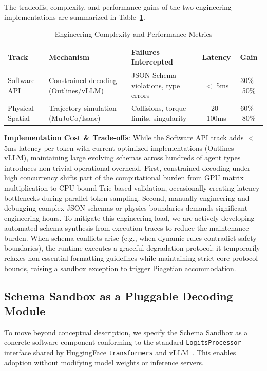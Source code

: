 \documentclass[10pt,journal,compsoc]{IEEEtran}
\begin{document}
The tradeoffs, complexity, and performance gains of the two engineering implementations are summarized in Table~\ref{tab:engineering}.

\begin{table}[t]
\centering
\caption{Engineering Complexity and Performance Metrics}
\label{tab:engineering}
\footnotesize
\begin{tabular}{lp{1.8cm}p{1.8cm}cc}
\toprule
\textbf{Track} & \textbf{Mechanism} & \textbf{Failures Intercepted} & \textbf{Latency} & \textbf{Gain} \\
\midrule
Software API & Constrained decoding (Outlines/vLLM) & JSON Schema violations, type errors & $<$ 5ms & 30\%--50\% \\
\midrule
Physical Spatial & Trajectory simulation (MuJoCo/Isaac) & Collisions, torque limits, singularity & 20--100ms & 60\%--80\% \\
\bottomrule
\end{tabular}
\end{table}

\textbf{Implementation Cost \& Trade-offs}: While the Software API track adds $<$ 5ms latency per token with current optimized implementations (Outlines + vLLM), maintaining large evolving schemas across hundreds of agent types introduces non-trivial operational overhead. First, constrained decoding under high concurrency shifts part of the computational burden from GPU matrix multiplication to CPU-bound Trie-based validation, occasionally creating latency bottlenecks during parallel token sampling. Second, manually engineering and debugging complex JSON schemas or physics boundaries demands significant engineering hours. To mitigate this engineering load, we are actively developing automated schema synthesis from execution traces to reduce the maintenance burden. When schema conflicts arise (e.g., when dynamic rules contradict safety boundaries), the runtime executes a graceful degradation protocol: it temporarily relaxes non-essential formatting guidelines while maintaining strict core protocol bounds, raising a sandbox exception to trigger Piagetian accommodation.

\subsection{Schema Sandbox as a Pluggable Decoding Module}
\label{subsec:pluggable}

To move beyond conceptual description, we specify the Schema Sandbox as a concrete software component conforming to the standard \texttt{LogitsProcessor} interface shared by HuggingFace \texttt{transformers} and vLLM~\cite{kwon2023vllm}. This enables adoption without modifying model weights or inference servers.
\end{document}
